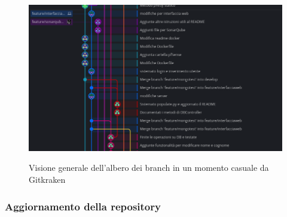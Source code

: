 	\begin{figure}[H]
		\centering
		\includegraphics[width=\textwidth]{img/branches.png}\\
		\caption[Albero dei branch da Gitkraken]{Visione generale dell'albero dei branch in un momento casuale da Gitkraken}
		\label{fig:butterfly}
	\end{figure}

	\subsubsection{Aggiornamento della repository}

